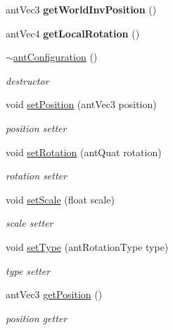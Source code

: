 \begin{DoxyCompactItemize}
\item 
\hypertarget{classant_configuration_aef7f12d2de1c1495ec4ab81c25999682}{ant\+Vec3 {\bfseries get\+World\+Inv\+Position} ()}\label{classant_configuration_aef7f12d2de1c1495ec4ab81c25999682}

\item 
\hypertarget{classant_configuration_a189ff0ba17188ddd8f17985c27f141ca}{ant\+Vec4 {\bfseries get\+Local\+Rotation} ()}\label{classant_configuration_a189ff0ba17188ddd8f17985c27f141ca}

\item 
\hyperlink{classant_configuration_a02d095455b83e07010bb3f5691547f2a}{$\sim$ant\+Configuration} ()
\begin{DoxyCompactList}\small\item\em destructor \end{DoxyCompactList}\item 
void \hyperlink{classant_configuration_a078e7f6338cae58eaffdfd6a1dd3268f}{set\+Position} (ant\+Vec3 position)
\begin{DoxyCompactList}\small\item\em position setter \end{DoxyCompactList}\item 
void \hyperlink{classant_configuration_a3b36b34f7171afd1b445f68367e3c1de}{set\+Rotation} (ant\+Quat rotation)
\begin{DoxyCompactList}\small\item\em rotation setter \end{DoxyCompactList}\item 
void \hyperlink{classant_configuration_a8d015790427644c17332993c8f63ae94}{set\+Scale} (float scale)
\begin{DoxyCompactList}\small\item\em scale setter \end{DoxyCompactList}\item 
void \hyperlink{classant_configuration_a28c3552db786edeb70dc223f3cc5b3e6}{set\+Type} (ant\+Rotation\+Type type)
\begin{DoxyCompactList}\small\item\em type setter \end{DoxyCompactList}\item 
ant\+Vec3 \hyperlink{classant_configuration_a4e178bdbab92eb1438b27d09a61bd2f3}{get\+Position} ()
\begin{DoxyCompactList}\small\item\em position getter \end{DoxyCompactList}\item 

\end{DoxyCompactItemize}
